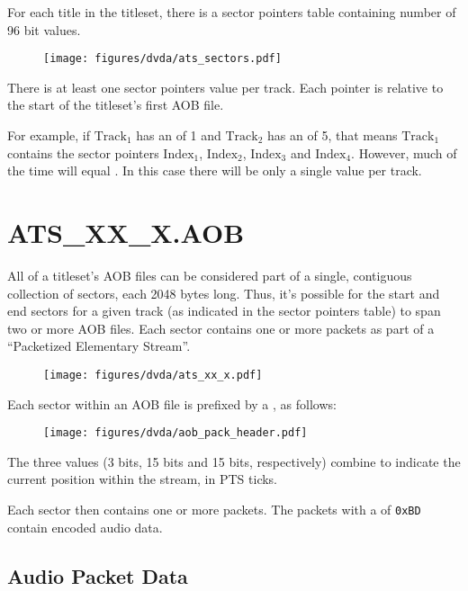 For each title in the titleset, there is a sector pointers table
containing  number of 96 bit values.

\begin{figure}[h]
\texttt{[image: figures/dvda/ats\_sectors.pdf]}
\end{figure}
\par
\noindent
There is at least one sector pointers value per track.
Each pointer is relative to the start of the titleset's first
AOB file.

For example, if $\text{Track}_1$ has an  of 1 and
$\text{Track}_2$ has an  of 5,
that means $\text{Track}_1$ contains the sector pointers
$\text{Index}_1$, $\text{Index}_2$, $\text{Index}_3$ and $\text{Index}_4$.
However, much of the time  will equal .
In this case there will be only a single  value per track.

\clearpage

\section{ATS\_XX\_X.AOB}

All of a titleset's AOB files can be considered part of a
single, contiguous collection of sectors, each 2048 bytes long.
Thus, it's possible for the start and end sectors for a given track
(as indicated in the sector pointers table) to span two or more
AOB files.
Each sector contains one or more packets as part of a
``Packetized Elementary Stream''.

\begin{figure}[h]
\texttt{[image: figures/dvda/ats\_xx\_x.pdf]}
\end{figure}
\par
\noindent
Each sector within an AOB file is prefixed by a ,
as follows:
\begin{figure}[h]
\texttt{[image: figures/dvda/aob\_pack\_header.pdf]}
\end{figure}
\par
\noindent
The three  values (3 bits, 15 bits and 15 bits, respectively)
combine to indicate the current position within the stream, in PTS ticks.
\par
Each sector then contains one or more packets.
The packets with a  of \texttt{0xBD} contain
encoded audio data.

\clearpage

\subsection{Audio Packet Data}

